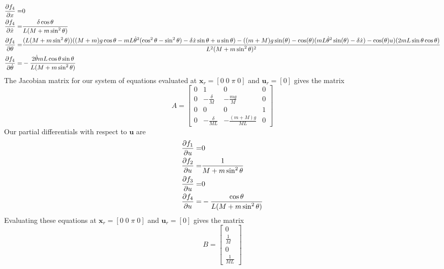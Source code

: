 \documentclass[]{article}
\newcommand{\bx}{\boldsymbol{x}}
\newcommand{\bu}{\boldsymbol{u}}
\begin{document}
\begin{eqnarray*}
	\pdv{f_4}{x} = & 0 \\
	\pdv{f_4}{\dot{x}} =&  \frac{\delta \cos \theta}{L(M + m \sin^2 \theta)} \\
	\pdv{f_4}{\theta} =  &  \frac{(L(M + m \sin^2 \theta))((M+m)g \cos \theta -mL\dot{\theta}^2(\cos^2 \theta - \sin^2 \theta) -\delta \dot{x} \sin \theta + u \sin \theta)-((m+M)g\sin(\theta)-\cos(\theta)(mL{\dot{\theta}}^2\sin(\theta)-\delta \dot{x})-\cos(\theta)u)(2mL \sin \theta \cos \theta)}{L^2(M + m \sin^2 \theta)^2} \\
	\pdv{f_4}{\dot{\theta}} = & -\frac{2\dot{\theta}mL \cos \theta \sin \theta}{L(M + m \sin^2 \theta)}
\end{eqnarray*}
The Jacobian matrix for our system of equations evaluated at $\bx_r = [0\; 0\; \pi \; 0]$ and $\bu_r = [0]$ gives the matrix
\begin{equation}
		A = 
	\begin{bmatrix}
		0 & 1              & 0                          & 0 \\
		0 & -\frac{\delta}{M}      & -\frac{mg}{M}                 & 0 \\
		0 & 0              & 0                          & 1 \\
		0 & -\frac{\delta}{ML} & -\frac{(m+M)g}{ML} & 0
	\end{bmatrix}
\end{equation}
Our partial differentials with respect to $\bu$ are
\begin{eqnarray*}
	\pdv{f_1}{u} = & 0 \\
	\pdv{f_2}{u} = & \frac{1}{M + m \sin^2 \theta}\\
	\pdv{f_3}{u} =  & 0 \\
	\pdv{f_4}{u} = & -\frac{\cos \theta}{L(M + m \sin^2 \theta)}
\end{eqnarray*}
Evaluating these equations at $\bx_r = [0\; 0\; \pi \; 0]$ and $\bu_r = [0]$ gives the matrix
\begin{equation}
	B = 
	\begin{bmatrix}
		0 \\
		\frac{1}{M}  \\
		0  \\
		\frac{1}{ML}   
	\end{bmatrix}
\end{equation}
\end{document}
